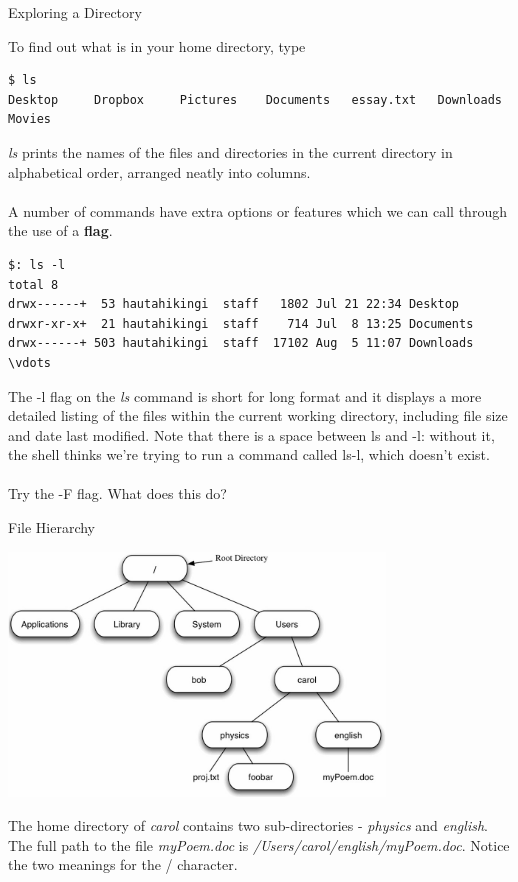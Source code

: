 \documentclass[10pt,leqno]{beamer}
\begin{document}
\begin{frame}[fragile]{Exploring a Directory}

To find out what is in your home directory, type
\begin{lstlisting}
$ ls				
Desktop		Dropbox		Pictures	Documents	essay.txt	Downloads	Movies
\end{lstlisting}
\emph{ls} prints the names of the files and directories in the current directory in alphabetical order, arranged neatly into columns.\\~\\

A number of commands have extra options or features which we can call through the use of a \textbf{flag}.
\begin{lstlisting}[frame=single]
$: ls -l
total 8
drwx------+  53 hautahikingi  staff   1802 Jul 21 22:34 Desktop
drwxr-xr-x+  21 hautahikingi  staff    714 Jul  8 13:25 Documents
drwx------+ 503 hautahikingi  staff  17102 Aug  5 11:07 Downloads
\vdots
\end{lstlisting}
The -l flag on the \emph{ls} command is short for long format and it displays a more detailed listing of the files within the current working directory, including file size and date last modified. Note that there is a space between ls and -l: without it, the shell thinks we're trying to run a command called ls-l, which doesn't exist.\\~\\

Try the -F flag. What does this do?
\end{frame}

\begin{frame}[fragile]{File Hierarchy}

\begin{center}
\includegraphics[width=10cm]{./auxfiles/tree.jpg}
\end{center}
The home directory of \emph{carol} contains two sub-directories - \emph{physics} and \emph{english}. The full path to the file \emph{myPoem.doc} is \emph{/Users/carol/english/myPoem.doc}. Notice the two meanings for the / character.

\end{frame}
\end{document}
